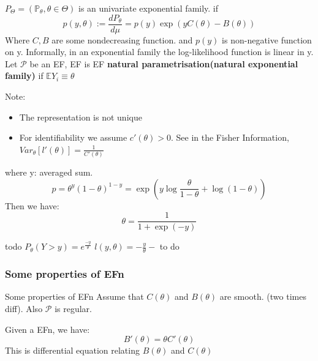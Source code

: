\begin{definition}
	$P_\Theta = (\mathbb{P}_\theta, \theta \in \Theta)$ is an univariate exponential family. if 
	\begin{equation*}
		p(y,\theta) := \frac{dP_\theta}{d\mu} = p(y) \exp (y C(\theta) - B(\theta))
	\end{equation*}
	Where $C, B$ are some nondecreasing function. and $p(y)$ is non-negative function on y. Informally, in an exponential family the log-likelihood function is linear in y. Let $\mathcal{P}$ be an EF, EF is EF \textbf{natural parametrisation(natural exponential family)} if $\mathbb{E} Y_i \equiv \theta$
\end{definition}


\begin{remark}
	Note:
	\begin{itemize}
		\item The representation is not unique
		\item For identifiability we assume $c'(\theta) >0$. See in the Fisher Information, $Var_\theta[l'(\theta)] = \frac{1}{C'(\theta)}$
	\end{itemize}
\end{remark}

\begin{example}[Bernoulli]
where y: averaged sum.
\begin{equation*}
	p = \theta^y (1-\theta)^{1 -y} =\exp\left( y \log \frac{\theta}{1 - \theta} + \log (1 - \theta)\right)
\end{equation*}
Then we have:
\begin{equation*}
	\theta = \frac{1}{1 + \exp(-y)}
\end{equation*}
\end{example}

\begin{example}
	todo	
	$P_\theta( Y > y) = e^{\frac{-y}{\theta}}$
	$l(y, \theta) = -\frac{y}{\theta} - $ to do
\end{example}

\subsubsection*{Some properties of EFn}
Some properties of EFn
Assume that $C(\theta)$ and $B(\theta)$ are smooth. (two times diff). Also $\mathcal{P}$ is regular.

\begin{lemma}
	Given a EFn, we have:
	\begin{equation} \label{ODE}
		B'(\theta) = \theta C'(\theta)
	\end{equation}
	This is differential equation relating $B(\theta)$ and $C(\theta)$
\end{lemma}

